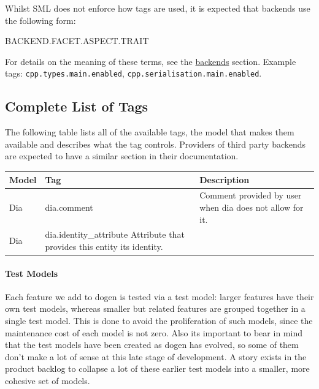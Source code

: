 \documentclass{book}
\begin{document}
Whilst SML does not enforce how tags are used, it is expected that
backends use the following form:

\begin{pseudocode}[backgroundcolor=\color{lightgray}]
BACKEND.FACET.ASPECT.TRAIT
\end{pseudocode}

For details on the meaning of these terms, see the
\href{https://github.com/DomainDrivenConsulting/dogen/blob/master/doc/manual/manual.org#the-backends}{backends}
section. Example tags: \texttt{cpp.types.main.enabled},
\texttt{cpp.serialisation.main.enabled}.

\subsection{Complete List of Tags}

The following table lists all of the available tags, the model that
makes them available and describes what the tag controls. Providers of
third party backends are expected to have a similar section in their
documentation.

\begin{center}
\begin{tabular}{lll}
Model & Tag & Description\\
\hline
Dia & dia.comment & Comment provided by user when dia does not allow for it.\\
Dia & dia.identity\_attribute Attribute that provides this entity its identity.\\
\end{tabular}
\end{center}

\paragraph{Test Models}

Each feature we add to dogen is tested via a test model: larger
features have their own test models, whereas smaller but related
features are grouped together in a single test model. This is done to
avoid the proliferation of such models, since the maintenance cost of
each model is not zero. Also its important to bear in mind that the
test models have been created as dogen has evolved, so some of them
don't make a lot of sense at this late stage of development. A story
exists in the product backlog to collapse a lot of these earlier test
models into a smaller, more cohesive set of models.
\end{document}
